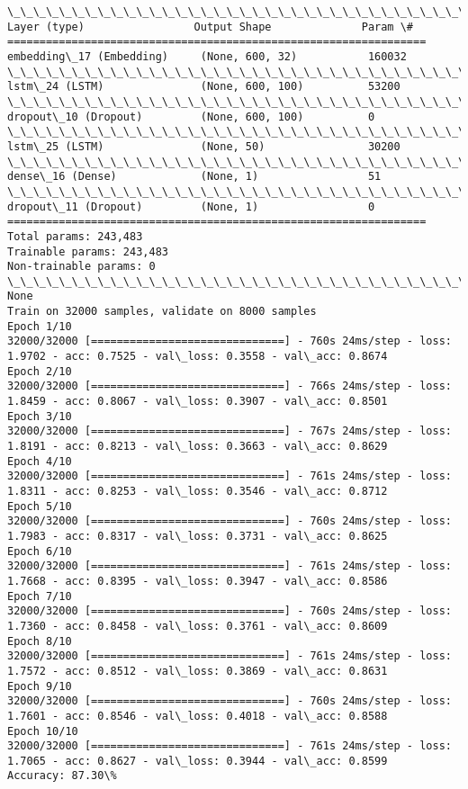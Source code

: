 \documentclass[11pt]{article}
\begin{document}
    \begin{Verbatim}[commandchars=\\\{\}]
\_\_\_\_\_\_\_\_\_\_\_\_\_\_\_\_\_\_\_\_\_\_\_\_\_\_\_\_\_\_\_\_\_\_\_\_\_\_\_\_\_\_\_\_\_\_\_\_\_\_\_\_\_\_\_\_\_\_\_\_\_\_\_\_\_
Layer (type)                 Output Shape              Param \#   
=================================================================
embedding\_17 (Embedding)     (None, 600, 32)           160032    
\_\_\_\_\_\_\_\_\_\_\_\_\_\_\_\_\_\_\_\_\_\_\_\_\_\_\_\_\_\_\_\_\_\_\_\_\_\_\_\_\_\_\_\_\_\_\_\_\_\_\_\_\_\_\_\_\_\_\_\_\_\_\_\_\_
lstm\_24 (LSTM)               (None, 600, 100)          53200     
\_\_\_\_\_\_\_\_\_\_\_\_\_\_\_\_\_\_\_\_\_\_\_\_\_\_\_\_\_\_\_\_\_\_\_\_\_\_\_\_\_\_\_\_\_\_\_\_\_\_\_\_\_\_\_\_\_\_\_\_\_\_\_\_\_
dropout\_10 (Dropout)         (None, 600, 100)          0         
\_\_\_\_\_\_\_\_\_\_\_\_\_\_\_\_\_\_\_\_\_\_\_\_\_\_\_\_\_\_\_\_\_\_\_\_\_\_\_\_\_\_\_\_\_\_\_\_\_\_\_\_\_\_\_\_\_\_\_\_\_\_\_\_\_
lstm\_25 (LSTM)               (None, 50)                30200     
\_\_\_\_\_\_\_\_\_\_\_\_\_\_\_\_\_\_\_\_\_\_\_\_\_\_\_\_\_\_\_\_\_\_\_\_\_\_\_\_\_\_\_\_\_\_\_\_\_\_\_\_\_\_\_\_\_\_\_\_\_\_\_\_\_
dense\_16 (Dense)             (None, 1)                 51        
\_\_\_\_\_\_\_\_\_\_\_\_\_\_\_\_\_\_\_\_\_\_\_\_\_\_\_\_\_\_\_\_\_\_\_\_\_\_\_\_\_\_\_\_\_\_\_\_\_\_\_\_\_\_\_\_\_\_\_\_\_\_\_\_\_
dropout\_11 (Dropout)         (None, 1)                 0         
=================================================================
Total params: 243,483
Trainable params: 243,483
Non-trainable params: 0
\_\_\_\_\_\_\_\_\_\_\_\_\_\_\_\_\_\_\_\_\_\_\_\_\_\_\_\_\_\_\_\_\_\_\_\_\_\_\_\_\_\_\_\_\_\_\_\_\_\_\_\_\_\_\_\_\_\_\_\_\_\_\_\_\_
None
Train on 32000 samples, validate on 8000 samples
Epoch 1/10
32000/32000 [==============================] - 760s 24ms/step - loss: 1.9702 - acc: 0.7525 - val\_loss: 0.3558 - val\_acc: 0.8674
Epoch 2/10
32000/32000 [==============================] - 766s 24ms/step - loss: 1.8459 - acc: 0.8067 - val\_loss: 0.3907 - val\_acc: 0.8501
Epoch 3/10
32000/32000 [==============================] - 767s 24ms/step - loss: 1.8191 - acc: 0.8213 - val\_loss: 0.3663 - val\_acc: 0.8629
Epoch 4/10
32000/32000 [==============================] - 761s 24ms/step - loss: 1.8311 - acc: 0.8253 - val\_loss: 0.3546 - val\_acc: 0.8712
Epoch 5/10
32000/32000 [==============================] - 760s 24ms/step - loss: 1.7983 - acc: 0.8317 - val\_loss: 0.3731 - val\_acc: 0.8625
Epoch 6/10
32000/32000 [==============================] - 761s 24ms/step - loss: 1.7668 - acc: 0.8395 - val\_loss: 0.3947 - val\_acc: 0.8586
Epoch 7/10
32000/32000 [==============================] - 760s 24ms/step - loss: 1.7360 - acc: 0.8458 - val\_loss: 0.3761 - val\_acc: 0.8609
Epoch 8/10
32000/32000 [==============================] - 761s 24ms/step - loss: 1.7572 - acc: 0.8512 - val\_loss: 0.3869 - val\_acc: 0.8631
Epoch 9/10
32000/32000 [==============================] - 760s 24ms/step - loss: 1.7601 - acc: 0.8546 - val\_loss: 0.4018 - val\_acc: 0.8588
Epoch 10/10
32000/32000 [==============================] - 761s 24ms/step - loss: 1.7065 - acc: 0.8627 - val\_loss: 0.3944 - val\_acc: 0.8599
Accuracy: 87.30\%

    \end{Verbatim}
\end{document}
